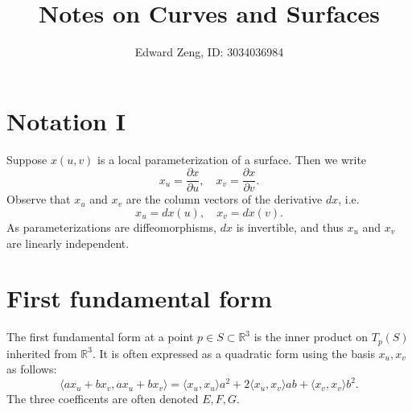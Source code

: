 \documentclass[12pt, letterpaper]{article}
\title{Notes on Curves and Surfaces}
\author{Edward Zeng, ID: 3034036984}
\newcommand{\bR}{{\mathbb R}}
\begin{document}
\maketitle

\section*{Notation I}
Suppose $x(u,v)$ is a local parameterization of a surface. Then we write
\[
    x_u = \frac{\partial x}{\partial u}, \quad x_v = \frac{\partial x}{\partial v}.
\]
Observe that $x_u$ and $x_v$ are the column vectors of the derivative $dx$, i.e.
\[
    x_u = dx(u), \quad x_v = dx(v).
\]
As parameterizations are diffeomorphisms, $dx$ is invertible, and thus $x_u$ and $x_v$ are linearly independent.

\section*{First fundamental form}
The first fundamental form at a point $p \in S \subset \bR^3$ is the inner product on $T_p(S)$ inherited from $\bR^3$. It is often expressed as a quadratic form using the basis $x_u, x_v$ as follows:
\[
    \langle ax_u + bx_v, ax_u + bx_v \rangle
    =
    \langle x_u, x_u \rangle a^2 + 2 \langle x_u, x_v \rangle ab + 
    \langle x_v, x_v \rangle b^2.
\]
The three coefficents are often denoted $E, F, G$.
\end{document}
